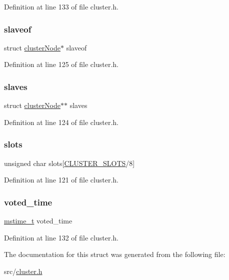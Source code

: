 Definition at line 133 of file cluster.\+h.

\mbox{\label{structcluster_node_a6a719a7df6dd52ea8f73b741001c2540}} 
\subsubsection{\texorpdfstring{slaveof}{slaveof}}
{\footnotesize\ttfamily struct \hyperlink{structcluster_node}{cluster\+Node}$\ast$ slaveof}



Definition at line 125 of file cluster.\+h.

\mbox{\label{structcluster_node_a0dcce9d83c3abdcf726eada2a2b747b6}} 
\subsubsection{\texorpdfstring{slaves}{slaves}}
{\footnotesize\ttfamily struct \hyperlink{structcluster_node}{cluster\+Node}$\ast$$\ast$ slaves}



Definition at line 124 of file cluster.\+h.

\mbox{\label{structcluster_node_a5860192f55932c04b85ec15307ee114b}} 
\subsubsection{\texorpdfstring{slots}{slots}}
{\footnotesize\ttfamily unsigned char slots\mbox{[}\hyperlink{cluster_8h_aa3e2cb951eebb16725ecc3f5beefd9fd}{C\+L\+U\+S\+T\+E\+R\+\_\+\+S\+L\+O\+TS}/8\mbox{]}}



Definition at line 121 of file cluster.\+h.

\mbox{\label{structcluster_node_ab7d11a3ddcc8b368b6ed249fb50b744b}} 
\subsubsection{\texorpdfstring{voted\+\_\+time}{voted\_time}}
{\footnotesize\ttfamily \hyperlink{redismodule_8h_a652ae61e2475bc8957454534544968fc}{mstime\+\_\+t} voted\+\_\+time}



Definition at line 132 of file cluster.\+h.



The documentation for this struct was generated from the following file\+:\begin{DoxyCompactItemize}
\item 
src/\hyperlink{cluster_8h}{cluster.\+h}\end{DoxyCompactItemize}
